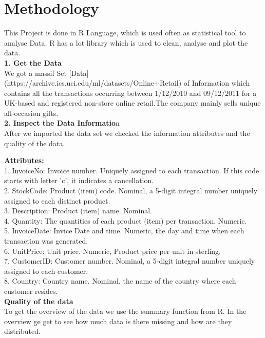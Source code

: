 \documentclass[11pt]{article}
\begin{document}
\newpage
\section{Methodology}

This Project is done in R Language, which is used often as statistical tool to analyse Data. R has a lot library which is used to clean, analyse and plot the data.\\

 {\large \textbf{1. Get the Data}}\\
We got a massif Set [Data](https://archive.ics.uci.edu/ml/datasets/Online+Retail) of Information which contains all the transactions occurring between 1/12/2010 and 09/12/2011 for a UK-based and registered non-store online retail.The company mainly sells unique all-occasion gifts.
\\
 {\large \textbf{ 2. Inspect the Data Informatio}}n \\
After we imported the data set we checked the information attributes and the quality of the data.

 \textbf{Attributes:} \\
1. InvoiceNo:    Invoice number. Uniquely assigned to each                 transaction. 
                 If this code starts with letter 'c', it  indicates a cancellation. \\
2. StockCode:    Product (item) code. Nominal, a 5-digit integral number uniquely assigned to each distinct product.\\ 
3. Description:  Product (item) name. Nominal. \\
4. Quantity:     The quantities of each product (item) per transaction. Numeric.	\\
5. InvoiceDate:  Invice Date and time. Numeric, the day and time when each transaction was generated. \\
6. UnitPrice:    Unit price. Numeric, Product price per unit in sterling. \\
7. CustomerID:   Customer number. Nominal, a 5-digit integral number uniquely assigned to each customer. \\
8. Country:      Country name. Nominal, the name of the country where each customer resides.\\


\textbf{Quality of the data}
\\
To get the overview of the data we use the summary function from R. In the overview ge get to see how much data is there missing and how are they distributed.  \\
\end{document}
